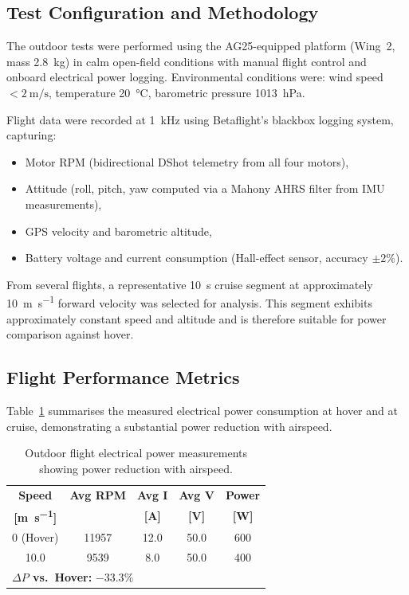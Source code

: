 \subsection{Test Configuration and Methodology}\label{sec:outdoor-methodology}

The outdoor tests were performed using the AG25-equipped platform (Wing~2, mass \SI{2.8}{\kg}) in calm open-field conditions with manual flight control and onboard electrical power logging.
Environmental conditions were: wind speed $< \SI{2}{\meter\per\second}$, temperature \SI{20}{\celsius}, barometric pressure \SI{1013}{\hecto\pascal}.

Flight data were recorded at \SI{1}{\kilo\hertz} using Betaflight's blackbox logging system, capturing:
\begin{itemize}
  \item Motor RPM (bidirectional DShot telemetry from all four motors),
  \item Attitude (roll, pitch, yaw computed via a Mahony AHRS filter from IMU measurements),
  \item GPS velocity and barometric altitude,
  \item Battery voltage and current consumption (Hall-effect sensor, accuracy $\pm 2\%$).
\end{itemize}

From several flights, a representative \SI{10}{\second} cruise segment at approximately \SI{10}{\meter\per\second} forward velocity was selected for analysis.
This segment exhibits approximately constant speed and altitude and is therefore suitable for power comparison against hover.

\subsection{Flight Performance Metrics}\label{sec:outdoor-metrics}

Table~\ref{tab:outdoor_power_summary} summarises the measured electrical power consumption at hover and at cruise, demonstrating a substantial power reduction with airspeed.

\begin{table}[htbp]
\centering
\caption{Outdoor flight electrical power measurements showing power reduction with airspeed.}
\label{tab:outdoor_power_summary}
\begin{tabular}{ccccc}
\hline
\textbf{Speed} & \textbf{Avg RPM} & \textbf{Avg I} & \textbf{Avg V} & \textbf{Power} \\
\textbf{[\si{\meter\per\second}]} & & \textbf{[\si{\ampere}]} & \textbf{[\si{\volt}]} & \textbf{[\si{\watt}]} \\
\hline
0 (Hover) & 11957 & 12.0 & 50.0 & 600 \\
10.0      &  9539 &  8.0 & 50.0 & 400 \\
\hline
\multicolumn{5}{l}{\textbf{$\Delta P$ vs.\ Hover:} $-33.3\%$} \\
\hline
\end{tabular}
\end{table}

